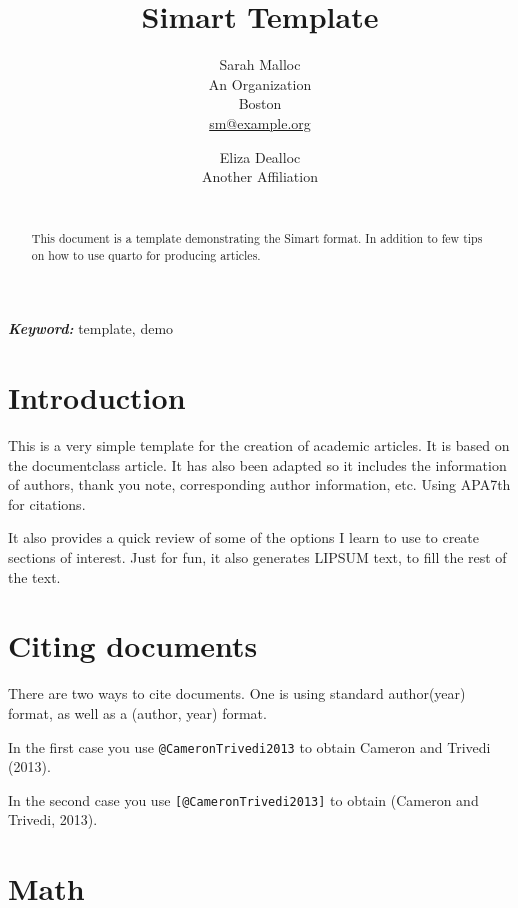 \documentclass[
  11pts,
]{article}
\title{Simart Template}
\author{
Sarah Malloc\\
An Organization\\
Boston\\
\href{mailto:sm@example.org}{sm@example.org}\and 
Eliza Dealloc\\
Another Affiliation\\
\\
}
\date{}
\begin{document}
\def\spacingset#1{\renewcommand{\baselinestretch}%
{#1}\small\normalsize} \spacingset{1}


\maketitle
\begin{abstract}
This document is a template demonstrating the Simart format. In addition
to few tips on how to use quarto for producing articles.
\end{abstract}
 
\vspace{.2in}

\textbf{\textit{Keyword: }}
    template, 
    demo 


\thispagestyle{empty}
\clearpage{}
\newpage
\spacingset{1.2} %
\section{Introduction}\label{sec-intro}

This is a very simple template for the creation of academic articles. It
is based on the documentclass article. It has also been adapted so it
includes the information of authors, thank you note, corresponding
author information, etc. Using APA7th for citations.

It also provides a quick review of some of the options I learn to use to
create sections of interest. Just for fun, it also generates LIPSUM
text, to fill the rest of the text.

\section{Citing documents}\label{sec-cite}

There are two ways to cite documents. One is using standard author(year)
format, as well as a (author, year) format.

In the first case you use \texttt{@CameronTrivedi2013} to obtain Cameron
and Trivedi (2013).

In the second case you use \texttt{{[}@CameronTrivedi2013{]}} to obtain
(Cameron and Trivedi, 2013).

\section{Math}\label{math}
\end{document}
